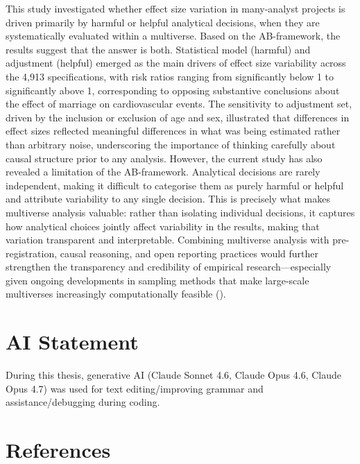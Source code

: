 \documentclass[
  man,
  floatsintext,
  longtable,
  nolmodern,
  notxfonts,
  notimes,
  colorlinks=true,linkcolor=blue,citecolor=blue,urlcolor=blue]{apa7}
\begin{document}
This study investigated whether effect size variation in many-analyst
projects is driven primarily by harmful or helpful analytical decisions,
when they are systematically evaluated within a multiverse. Based on the
AB-framework, the results suggest that the answer is both. Statistical
model (harmful) and adjustment (helpful) emerged as the main drivers of
effect size variability across the 4,913 specifications, with risk
ratios ranging from significantly below 1 to significantly above 1,
corresponding to opposing substantive conclusions about the effect of
marriage on cardiovascular events. The sensitivity to adjustment set,
driven by the inclusion or exclusion of age and sex, illustrated that
differences in effect sizes reflected meaningful differences in what was
being estimated rather than arbitrary noise, underscoring the importance
of thinking carefully about causal structure prior to any analysis.
However, the current study has also revealed a limitation of the
AB-framework. Analytical decisions are rarely independent, making it
difficult to categorise them as purely harmful or helpful and attribute
variability to any single decision. This is precisely what makes
multiverse analysis valuable: rather than isolating individual
decisions, it captures how analytical choices jointly affect variability
in the results, making that variation transparent and interpretable.
Combining multiverse analysis with pre-registration, causal reasoning,
and open reporting practices would further strengthen the transparency
and credibility of empirical research---especially given ongoing
developments in sampling methods that make large-scale multiverses
increasingly computationally feasible
().

\section{AI Statement}\label{ai-statement}

During this thesis, generative AI (Claude Sonnet 4.6, Claude Opus 4.6,
Claude Opus 4.7) was used for text editing/improving grammar and
assistance/debugging during coding.

\newpage

\section{References}\label{references}
\end{document}
